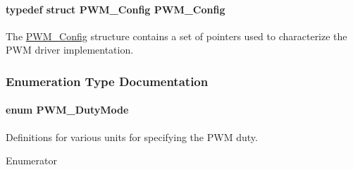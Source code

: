 \paragraph[{P\-W\-M\-\_\-\-Config}]{\setlength{\rightskip}{0pt plus 5cm}typedef struct {\bf P\-W\-M\-\_\-\-Config}  {\bf P\-W\-M\-\_\-\-Config}}\label{_p_w_m_8h_a007c9e36d0b1afcff70e1f2201845236}


The \hyperlink{struct_p_w_m___config}{P\-W\-M\-\_\-\-Config} structure contains a set of pointers used to characterize the P\-W\-M driver implementation. 



\subsubsection{Enumeration Type Documentation}
\paragraph[{P\-W\-M\-\_\-\-Duty\-Mode}]{\setlength{\rightskip}{0pt plus 5cm}enum {\bf P\-W\-M\-\_\-\-Duty\-Mode}}\label{_p_w_m_8h_a6c5ba2703cb9cc02773b5073046c1607}


Definitions for various units for specifying the P\-W\-M duty. 

\begin{Desc}
\item[Enumerator]\par
\begin{description}
\item[{\em 
P\-W\-M\-\_\-\-D\-U\-T\-Y\-\_\-\-C\-O\-U\-N\-T\-S\label{_p_w_m_8h_a6c5ba2703cb9cc02773b5073046c1607a4a20018a9620ed669dff0893858a44b2}
}]\item[{\em 
P\-W\-M\-\_\-\-D\-U\-T\-Y\-\_\-\-S\-C\-A\-L\-A\-R\label{_p_w_m_8h_a6c5ba2703cb9cc02773b5073046c1607a2611c911a0eba0b814c8da5e464d2864}
}]\item[{\em 
P\-W\-M\-\_\-\-D\-U\-T\-Y\-\_\-\-T\-I\-M\-E\label{_p_w_m_8h_a6c5ba2703cb9cc02773b5073046c1607a4e450c41a62390183087c6ec32e65bd5}
}]\end{description}
\end{Desc}
